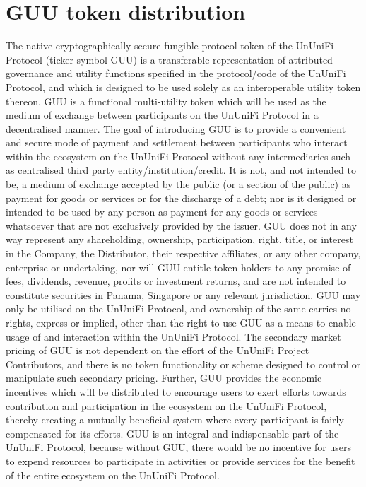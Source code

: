 \documentclass[dvipdfmx]{jsarticle}
\begin{document}
\section{GUU token distribution}
The native cryptographically-secure fungible protocol token of the UnUniFi Protocol (ticker symbol GUU) is a transferable representation of attributed governance and utility functions specified in the protocol/code of the UnUniFi Protocol, and which is designed to be used solely as an interoperable utility token thereon.
GUU is a functional multi-utility token which will be used as the medium of exchange between participants on the UnUniFi Protocol in a decentralised manner. 
The goal of introducing GUU is to provide a convenient and secure mode of payment and settlement between participants who interact within the ecosystem on the UnUniFi Protocol without any intermediaries such as centralised third party entity/institution/credit. 
It is not, and not intended to be, a medium of exchange accepted by the public (or a section of the public) as payment for goods or services or for the discharge of a debt; nor is it designed or intended to be used by any person as payment for any goods or services whatsoever that are not exclusively provided by the issuer. 
GUU does not in any way represent any shareholding, ownership, participation, right, title, or interest in the Company, the Distributor, their respective affiliates, or any other company, enterprise or undertaking, nor will GUU entitle token holders to any promise of fees, dividends, revenue, profits or investment returns, and are not intended to constitute securities in Panama, Singapore or any relevant jurisdiction. 
GUU may only be utilised on the UnUniFi Protocol, and ownership of the same carries no rights, express or implied, other than the right to use GUU as a means to enable usage of and interaction within the UnUniFi Protocol. 
The secondary market pricing of GUU is not dependent on the effort of the UnUniFi Project Contributors, and there is no token functionality or scheme designed to control or manipulate such secondary pricing.
Further, GUU provides the economic incentives which will be distributed to encourage users to exert efforts towards contribution and participation in the ecosystem on the UnUniFi Protocol, thereby creating a mutually beneficial system where every participant is fairly compensated for its efforts. 
GUU is an integral and indispensable part of the UnUniFi Protocol, because without GUU, there would be no incentive for users to expend resources to participate in activities or provide services for the benefit of the entire ecosystem on the UnUniFi Protocol. 
\end{document}
